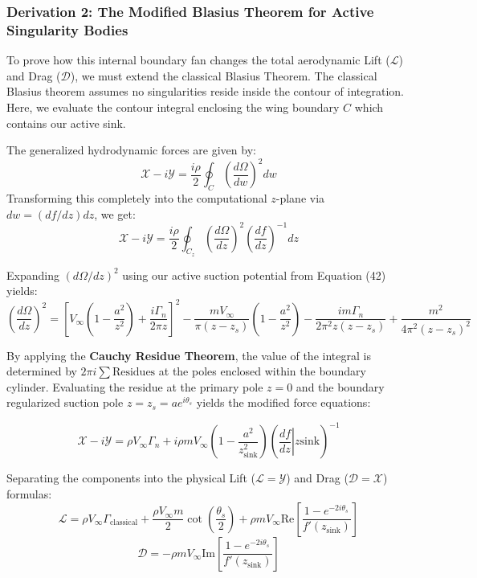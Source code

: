 \documentclass[12pt,a4paper]{article}
\begin{document}
\subsubsection{Derivation 2: The Modified Blasius Theorem for Active Singularity Bodies}
To prove how this internal boundary fan changes the total aerodynamic Lift ($\mathcal{L}$) and Drag ($\mathcal{D}$), we must extend the classical Blasius Theorem. The classical Blasius theorem assumes no singularities reside inside the contour of integration. Here, we evaluate the contour integral enclosing the wing boundary $C$ which contains our active sink.

The generalized hydrodynamic forces are given by:
\begin{equation}
    \mathcal{X} - i\mathcal{Y} = \frac{i\rho}{2} \oint_{C} \left( \frac{d\Omega}{dw} \right)^2 dw
\end{equation}
Transforming this completely into the computational $z$-plane via $dw = (df/dz)dz$, we get:
\begin{equation}
    \mathcal{X} - i\mathcal{Y} = \frac{i\rho}{2} \oint_{C_z} \left( \frac{d\Omega}{dz} \right)^2 \left( \frac{df}{dz} \right)^{-1} dz
\end{equation}

Expanding $(d\Omega/dz)^2$ using our active suction potential from Equation (42) yields:
\begin{equation}
    \left( \frac{d\Omega}{dz} \right)^2 = \left[ V_\infty \left(1 - \frac{a^2}{z^2}\right) + \frac{i\Gamma_n}{2\pi z} \right]^2 - \frac{mV_\infty}{\pi (z - z_s)}\left(1 - \frac{a^2}{z^2}\right) - \frac{i m \Gamma_n}{2\pi^2 z(z - z_s)} + \frac{m^2}{4\pi^2 (z - z_s)^2}
\end{equation}

By applying the \textbf{Cauchy Residue Theorem}, the value of the integral is determined by $2\pi i \sum \text{Residues}$ at the poles enclosed within the boundary cylinder. Evaluating the residue at the primary pole $z=0$ and the boundary regularized suction pole $z = z_s = a e^{i\theta_s}$ yields the modified force equations:

\begin{equation}
    \mathcal{X} - i\mathcal{Y} = \rho V_\infty \Gamma_n + i\rho m V_\infty \left( 1 - \frac{a^2}{z_{\text{sink}}^2} \right) \left( \left.\frac{df}{dz}\right|{z{\text{sink}}} \right)^{-1}
\end{equation}

Separating the components into the physical Lift ($\mathcal{L} = \mathcal{Y}$) and Drag ($\mathcal{D} = \mathcal{X}$) formulas:
\begin{equation}
    \boxed{\mathcal{L} = \rho V_\infty \Gamma_{\text{classical}} + \frac{\rho V_\infty m}{2}\cot\left(\frac{\theta_s}{2}\right) + \rho m V_\infty \text{Re}\left[ \frac{1 - e^{-2i\theta_s}}{f'(z_{\text{sink}})} \right]}
\end{equation}
\begin{equation}
    \boxed{\mathcal{D} = -\rho m V_\infty \text{Im}\left[ \frac{1 - e^{-2i\theta_s}}{f'(z_{\text{sink}})} \right]}
\end{equation}
\end{document}
